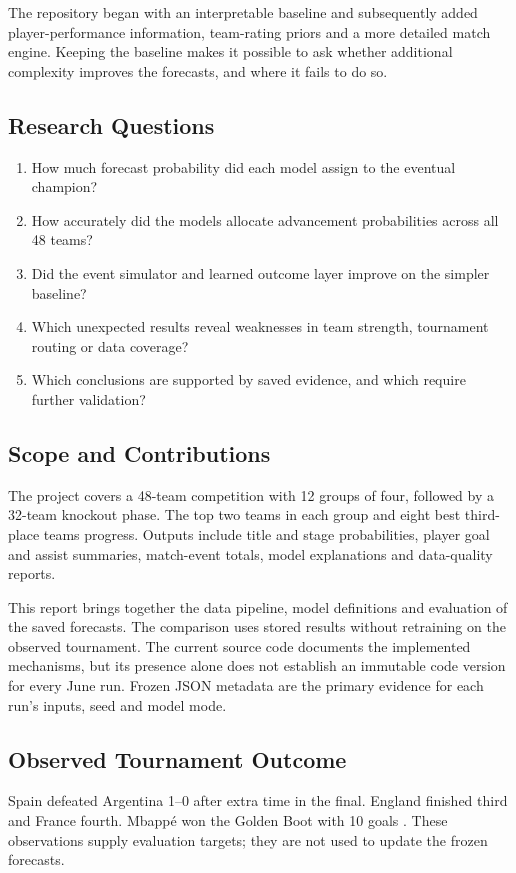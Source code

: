 \documentclass[11pt,a4paper]{article}
\begin{document}
The repository began with an interpretable baseline and subsequently added
player-performance information, team-rating priors and a more detailed match
engine. Keeping the baseline makes it possible to ask whether additional
complexity improves the forecasts, and where it fails to do so.
\subsection{Research Questions}
\begin{enumerate}
\item How much forecast probability did each model assign to the eventual champion?
\item How accurately did the models allocate advancement probabilities across all 48 teams?
\item Did the event simulator and learned outcome layer improve on the simpler baseline?
\item Which unexpected results reveal weaknesses in team strength, tournament routing or data coverage?
\item Which conclusions are supported by saved evidence, and which require further validation?
\end{enumerate}
\subsection{Scope and Contributions}
The project covers a 48-team competition with 12 groups of four, followed by
a 32-team knockout phase. The top two teams in each group and eight best
third-place teams progress. Outputs include title and stage probabilities,
player goal and assist summaries, match-event totals, model explanations and
data-quality reports.

This report brings together the data pipeline, model definitions and evaluation
of the saved forecasts. The comparison uses stored results without retraining
on the observed tournament. The current source code documents the implemented
mechanisms, but its presence alone does not establish an immutable code version
for every June run. Frozen JSON metadata are the primary evidence for each
run's inputs, seed and model mode.
\subsection{Observed Tournament Outcome}
Spain defeated Argentina 1--0 after extra time in the final. England finished
third and France fourth. Mbapp\'{e} won the Golden Boot with 10 goals
\cite{outcome-final,outcome-standings,outcome-awards}. These observations supply
evaluation targets; they are not used to update the frozen forecasts.
\clearpage
\end{document}
